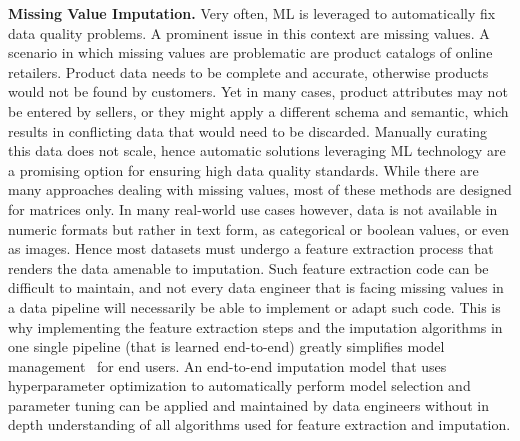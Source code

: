 \documentclass[11pt]{article}
\newcommand{\hdr}[1]{\noindent\textbf{#1.}}
\begin{document}
\hdr{Missing Value Imputation} Very often, ML is leveraged to automatically fix data quality problems. A prominent issue in this context are missing values. A scenario in which missing values are problematic are product catalogs of online retailers. Product data needs to be complete and accurate, otherwise products would not be found by customers. Yet in many cases, product attributes may not be entered by sellers, or they might apply a different schema and semantic, which results in conflicting data that would need to be discarded. Manually curating this data does not scale, hence automatic solutions leveraging ML technology are a promising option for ensuring high data quality standards. While there are many approaches dealing with missing values, most of these methods are designed for matrices only. In many real-world use cases however, data is not available in numeric formats but rather in text form, as categorical or boolean values, or even as images. Hence most datasets must undergo a feature extraction process that renders the data amenable to imputation. Such feature extraction code can be difficult to maintain, and not every data engineer that is facing missing values in a data pipeline will necessarily be able to implement or adapt such code. This is why  implementing the feature extraction steps and the imputation algorithms in one single pipeline (that is learned end-to-end) greatly simplifies model management~\cite{Biessmann2018} for end users. An end-to-end imputation model that uses hyperparameter optimization to automatically perform model selection and parameter tuning can be applied and maintained by data engineers without in depth understanding of all algorithms used for feature extraction and imputation.\\
\end{document}
